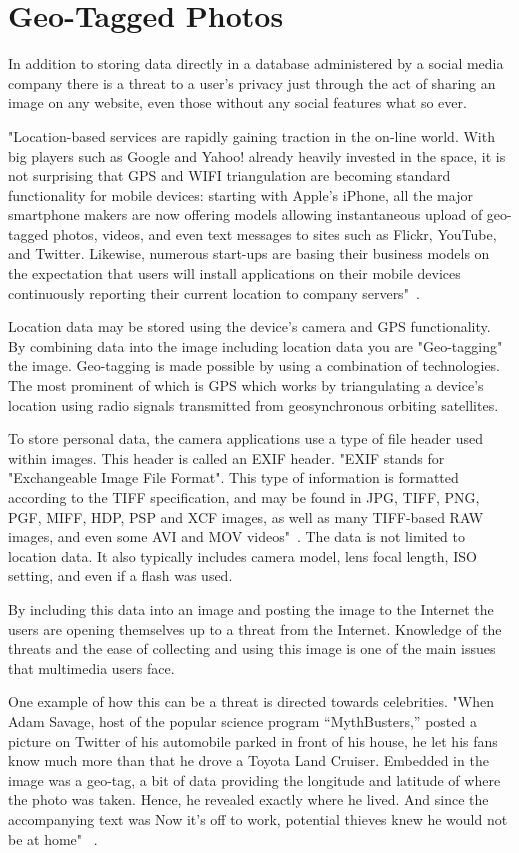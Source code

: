 \section{Geo-Tagged Photos}
In addition to storing data directly in a database administered by a social media
company there is a threat to a user's privacy just through the act of sharing an
image on any website, even those without any social features what so ever.

"Location-based services are rapidly gaining traction in the on-line world. With
big players such as Google and Yahoo! already heavily invested in the space, it
is not surprising that GPS and WIFI triangulation are becoming standard
functionality for mobile devices: starting with Apple’s iPhone, all the major
smartphone makers are now offering models allowing instantaneous upload of
geo-tagged photos, videos, and even text messages to sites such as Flickr,
YouTube, and Twitter. Likewise, numerous start-ups are basing their business
models on the expectation that users will install applications on their mobile
devices continuously reporting their current location to company
servers"~\cite{friedlcybercasing}.

Location data may be stored using the device's camera and GPS functionality. By
combining data into the image including location data you are "Geo-tagging" the
image. Geo-tagging is made possible by using a combination of technologies. The
most prominent of which is GPS which works by triangulating a device's location
using radio signals transmitted from geosynchronous orbiting satellites. 

To store personal data, the camera applications use a type of file header used within
images. This header is called an EXIF header. "EXIF stands for "Exchangeable
Image File Format". This type of information is formatted according to the TIFF
specification, and may be found in JPG, TIFF, PNG, PGF, MIFF, HDP, PSP and XCF
images, as well as many TIFF-based RAW images, and even some AVI and MOV
videos"~\cite{EXIF}. The data is not limited to location data. It also typically
includes camera model, lens focal length, ISO setting, and even if a flash was
used. 

By including this data into an image and posting the image to the Internet the
users are opening themselves up to a threat from the Internet. Knowledge of the
threats and the ease of collecting and using this image is one of the main issues
that multimedia users face.

One example of how this can be a threat is directed towards celebrities. "When
Adam Savage, host of the popular science program “MythBusters,” posted a picture
on Twitter of his automobile parked in front of his house, he let his fans know
much more than that he drove a Toyota Land Cruiser. Embedded in the image was a
geo-tag, a bit of data providing the longitude and latitude of where the photo
was taken. Hence, he revealed exactly where he lived. And since the accompanying
text was Now it’s off to work, potential thieves knew he would not be at home"
~\cite{geotagnyt}.%

